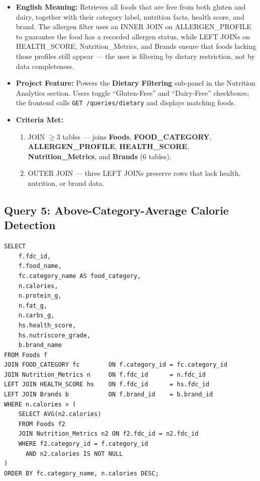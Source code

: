 \documentclass[12pt,a4paper]{article}
\begin{document}
\begin{metabox}
\begin{itemize}
  \item \textbf{English Meaning:} Retrieves all foods that are free from both gluten and dairy,
    together with their category label, nutrition facts, health score, and brand. The allergen
    filter uses an INNER JOIN on ALLERGEN\_PROFILE to guarantee the food has a recorded allergen
    status, while LEFT JOINs on HEALTH\_SCORE, Nutrition\_Metrics, and Brands ensure that foods
    lacking those profiles still appear --- the user is filtering by dietary restriction, not by
    data completeness.
  \item \textbf{Project Feature:} Powers the \textbf{Dietary Filtering} sub-panel in the
    Nutrition Analytics section. Users toggle ``Gluten-Free'' and ``Dairy-Free'' checkboxes;
    the frontend calls \texttt{GET /queries/dietary} and displays matching foods.
  \item \textbf{Criteria Met:}
    \begin{enumerate}[label=\textbf{\arabic*}]
      \item JOIN $\geq$3 tables --- joins \textbf{Foods}, \textbf{FOOD\_CATEGORY},
        \textbf{ALLERGEN\_PROFILE}, \textbf{HEALTH\_SCORE}, \textbf{Nutrition\_Metrics},
        and \textbf{Brands} (6 tables).
      \item OUTER JOIN --- three LEFT JOINs preserve rows that lack health, nutrition, or
        brand data.
    \end{enumerate}
\end{itemize}
\end{metabox}

\subsection{Query 5: Above-Category-Average Calorie Detection}

\begin{sqlbox}
\small
\begin{verbatim}
SELECT
    f.fdc_id,
    f.food_name,
    fc.category_name AS food_category,
    n.calories,
    n.protein_g,
    n.fat_g,
    n.carbs_g,
    hs.health_score,
    hs.nutriscore_grade,
    b.brand_name
FROM Foods f
JOIN FOOD_CATEGORY fc        ON f.category_id = fc.category_id
JOIN Nutrition_Metrics n     ON f.fdc_id      = n.fdc_id
LEFT JOIN HEALTH_SCORE hs    ON f.fdc_id      = hs.fdc_id
LEFT JOIN Brands b           ON f.brand_id    = b.brand_id
WHERE n.calories > (
    SELECT AVG(n2.calories)
    FROM Foods f2
    JOIN Nutrition_Metrics n2 ON f2.fdc_id = n2.fdc_id
    WHERE f2.category_id = f.category_id
      AND n2.calories IS NOT NULL
)
ORDER BY fc.category_name, n.calories DESC;
\end{verbatim}
\end{sqlbox}
\end{document}

